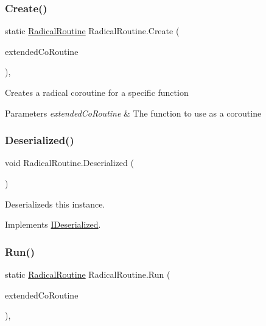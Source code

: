 \subsubsection{\texorpdfstring{Create()}{Create()}}
{\footnotesize\ttfamily static \hyperlink{class_radical_routine}{Radical\+Routine} Radical\+Routine.\+Create (\begin{DoxyParamCaption}\item[{I\+Enumerator}]{extended\+Co\+Routine }\end{DoxyParamCaption})\hspace{0.3cm}{\ttfamily [inline]}, {\ttfamily [static]}}



Creates a radical coroutine for a specific function 


\begin{DoxyParams}{Parameters}
{\em extended\+Co\+Routine} & The function to use as a coroutine \\
\hline
\end{DoxyParams}
\mbox{\label{class_radical_routine_a4e2d17f21fc9df7ef8bb06ba3a22e9e0}} 
\subsubsection{\texorpdfstring{Deserialized()}{Deserialized()}}
{\footnotesize\ttfamily void Radical\+Routine.\+Deserialized (\begin{DoxyParamCaption}{ }\end{DoxyParamCaption})\hspace{0.3cm}{\ttfamily [inline]}}



Deserializeds this instance. 



Implements \hyperlink{interface_i_deserialized_a87ea2dedb353ae446a8db2187819d184}{I\+Deserialized}.

\mbox{\label{class_radical_routine_a548acf1cd3335a543c8014a87d2fa26b}} 
\subsubsection{\texorpdfstring{Run()}{Run()}\hspace{0.1cm}{\footnotesize\ttfamily [1/6]}}
{\footnotesize\ttfamily static \hyperlink{class_radical_routine}{Radical\+Routine} Radical\+Routine.\+Run (\begin{DoxyParamCaption}\item[{I\+Enumerator}]{extended\+Co\+Routine }\end{DoxyParamCaption})\hspace{0.3cm}{\ttfamily [inline]}, {\ttfamily [static]}}



